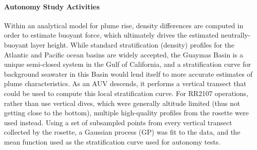 \paragraph{Autonomy Study Activities}
Within an analytical model for plume rise, density differences are computed in order to estimate buoyant force, which ultimately drives the estimated neutrally-buoyant layer height.
While standard stratification (density) profiles for the Atlantic and Pacific ocean basins are widely accepted\autocite{speer1989model}, the Guaymas Basin is a unique semi-closed system in the Gulf of California, and a stratification curve for background seawater in this Basin would lend itself to more accurate estimates of plume characteristics. As an AUV descends, it performs a vertical transect that could be used to compute this local stratification curve. For RR2107 operations, rather than use \Sentry vertical dives, which were generally altitude limited (thus not getting close to the bottom), multiple high-quality profiles from the rosette were used instead. Using a set of subsampled points from every vertical transect collected by the rosette, a Gaussian process (GP) was fit to the data, and the mean function used as the stratification curve used for autonomy tests.

